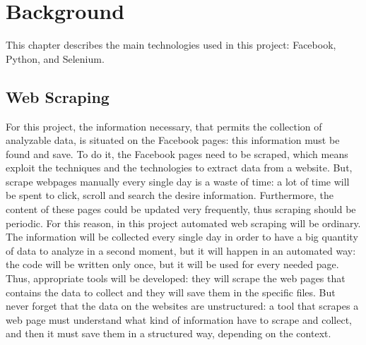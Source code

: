 

\chapter{Background}
\label{cap:background}
This chapter describes the main technologies used in this project: Facebook, Python, and Selenium.
\section{Web Scraping}
For this project, the information necessary, that permits the collection of analyzable data, is situated on the Facebook pages: this information must be found and save. To do it, the Facebook pages need to be scraped, which means exploit the techniques and the technologies to extract data from a website. But, scrape webpages manually every single day is a waste of time: a lot of time will be spent to click, scroll and search the desire information. Furthermore, the content of these pages could be updated very frequently, thus scraping should be periodic. For this reason, in this project automated web scraping will be ordinary. The information will be collected every single day in order to have a big quantity of data to analyze in a second moment, but it will happen in an automated way: the code will be written only once, but it will be used for every needed page. Thus, appropriate tools will be developed: they will scrape the web pages that contains the data to collect and they will save them in the specific files. But never forget that the data on the websites are unstructured: a tool that scrapes a web page must understand what kind of information have to scrape and collect, and then it must save them in a structured way, depending on the context.

